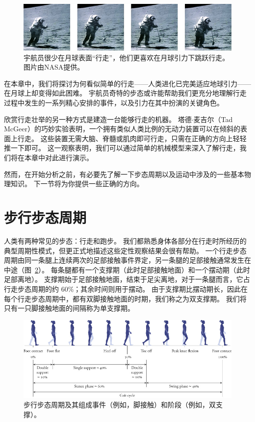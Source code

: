 \begin{figure}[!htb]
	\centering
	\includegraphics[width=1.0\linewidth]{chap2/2_1}
	\caption{宇航员很少在月球表面“行走”，他们更喜欢在月球引力下跳跃行走。
		图片由NASA提供。 \label{fig:2_1}}
\end{figure}


在本章中，我们将探讨为何看似简单的行走——人类进化已完美适应地球引力——在月球上却变得如此困难。
宇航员奇特的步态或许能帮助我们更充分地理解行走过程中发生的一系列精心安排的事件，以及引力在其中扮演的关键角色。


欣赏行走壮举的另一种方式是建造一台能够行走的机器。
塔德$\cdot$麦吉尔（Tad McGeer）的巧妙实验表明，一个拥有类似人类比例的无动力装置可以在倾斜的表面上行走。
这些装置无需大脑、脊髓或肌肉即可行走，只需在正确的方向上轻轻推一下即可。
这一观察表明，我们可以通过简单的机械模型来深入了解行走，我们将在本章中对此进行演示。


然而，在开始分析之前，有必要先了解一下步态周期以及运动中涉及的一些基本物理知识。
下一节将为你提供一些正确的方向。


\section{步行步态周期}

人类有两种常见的步态：行走和跑步。
我们都熟悉身体各部分在行走时所经历的典型周期性模式，但更正式地描述这些定性观察结果会很有帮助。
一个行走步态周期由同一条腿上连续两次的足部接触事件界定，另一条腿的足部接触通常发生在中途（图~\ref{fig:2_2}）。
每条腿都有一个支撑期（此时足部接触地面）和一个摆动期（此时足部离地）。
支撑期始于足部接触地面，结束于足尖离地，对于一条腿而言，它占行走步态周期的约 60\%；其余时间则用于摆动。
由于支撑期比摆动期长，因此在每个行走步态周期中，都有双脚接触地面的时期，我们称之为双支撑期。
我们将只有一只脚接触地面的间隔称为单支撑期。


\begin{figure}[!htb]
	\centering
	\includegraphics[width=1.0\linewidth]{chap2/2_2}
	\caption{步行步态周期及其组成事件（例如，脚接触）和阶段（例如，双支撑）。 \label{fig:2_2}}
\end{figure}


